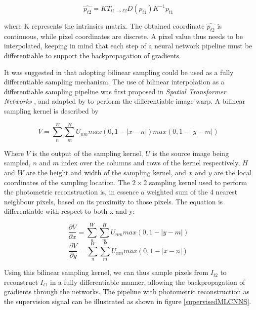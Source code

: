 \documentclass[openany]{book}
\begin{document}
\begin{equation}
\hat{p_{t2}} = KT_{t1\rightarrow t2} D(p_{t1}) K^{-1} p_{t1}
\end{equation}

where K represents the intrinsics matrix. The obtained coordinate $\hat{p_{t2}}$ is continuous, while pixel coordinates are discrete. A pixel value thus needs to be interpolated, keeping in mind that each step of a neural network pipeline must be differentiable to support the backpropagation of gradients. 

It was suggested in \cite{zhou2017unsupervised} that adopting bilinear sampling could be used as a fully differentiable sampling mechanism. The use of bilinear interpolation as a differentiable sampling pipeline was first proposed in \textit{Spatial Transformer Networks} \cite{jaderberg2015spatialtransformer}, and adapted by \cite{zhou2017unsupervised} to perform the differentiable image warp. A bilinear sampling kernel is described by 

\begin{equation}
    V = \sum_n^W \sum_m^H U_{nm} max (0, 1-|x - n|) max(0, 1-|y - m|)
\end{equation}

Where $V$ is the output of the sampling kernel, $U$ is the source image being sampled, $n$ and $m$ index over the columns and rows of the kernel respectively, $H$ and $W$ are the height and width of the sampling kernel, and $x$ and $y$ are the local coordinates of the sampling location. The $2 \times 2$ sampling kernel used to perform the photometric reconstruction is, in essence a weighted sum of the 4 nearest neighbour pixels, based on its proximity to those pixels. The equation is differentiable with respect to both x and y:


\begin{equation}
    \frac{\partial{V}}{\partial{x}} = \sum_n^W \sum_m^H U_{nm} max(0, 1-|y - m|)
\end{equation}
\begin{equation}
    \frac{\partial{V}}{\partial{y}} = \sum_n^W \sum_m^H U_{nm} max(0, 1-|x - n|)
\end{equation}

Using this bilinear sampling kernel, we can thus sample pixels from $I_{t2}$ to reconstruct $I_{t1}$ in a fully differentiable manner, allowing the backpropagation of gradients through the networks. The pipeline with photometric reconstruction as the supervision signal can be illustrated as shown in figure \ref{supervisedMLCNNS}.
\end{document}
